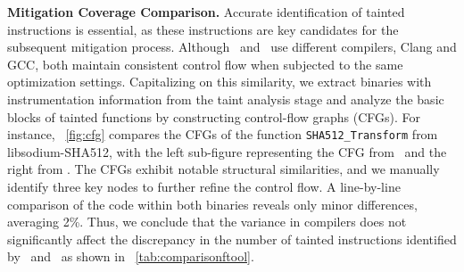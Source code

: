 
\noindent \textbf{Mitigation Coverage Comparison.}
Accurate identification of tainted instructions is essential, as these instructions are key candidates for the subsequent mitigation process. 
Although \tool\ and \ftool\ use different compilers, Clang and GCC, both maintain consistent control flow when subjected to the same optimization settings. 
Capitalizing on this similarity, we extract binaries with instrumentation information from the taint analysis stage and analyze the basic blocks of tainted functions by constructing control-flow graphs (CFGs). 
For instance, \F~\ref{fig:cfg} compares the CFGs of the function \texttt{SHA512\_Transform} from libsodium-SHA512, with the left sub-figure representing the CFG from \tool\ and the right from \ftool. 
The CFGs exhibit notable structural similarities, and we manually identify three key nodes to further refine the control flow. 
A line-by-line comparison of the code within both binaries reveals only minor differences, averaging 2\%. 
Thus, we conclude that the variance in compilers does not significantly affect the discrepancy in the number of tainted instructions identified by \tool\ and \ftool\ as shown in \T~\ref{tab:comparisonftool}.

